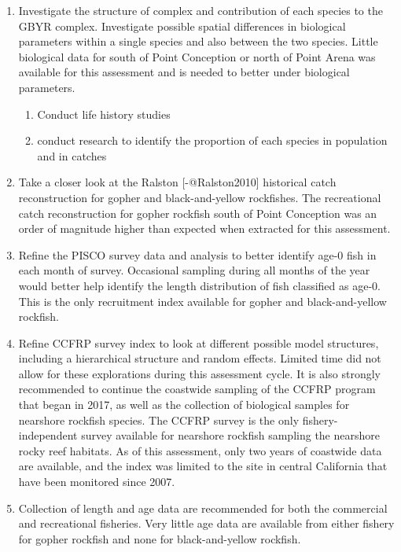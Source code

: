 \documentclass[12pt,]{article}
\begin{document}
\begin{enumerate}

\item Investigate the structure of complex and contribution of each species to the 
GBYR complex. Investigate possible spatial differences in biological parameters within 
a single species and also between the two species.  Little biological data for south of 
Point Conception or north of Point Arena was available for this assessment and is needed 
to better under biological parameters. 
    \begin{enumerate}
     \item Conduct life history studies
     \item conduct research to identify the proportion of each species in population and in catches
    \end{enumerate}

\item Take a closer look at the Ralston [-@Ralston2010] historical catch reconstruction 
for gopher and black-and-yellow rockfishes.  The recreational catch reconstruction for 
gopher rockfish south of Point Conception was an order of magnitude higher than expected 
when extracted for this assessment.  

\item Refine the PISCO survey data and analysis to better identify age-0 fish in each 
month of survey.  Occasional sampling during all months of the year would better help 
identify the length distribution of fish classified as age-0. This is the only recruitment 
index available for gopher and black-and-yellow rockfish.

\item Refine CCFRP survey index to look at different possible model structures, including 
a hierarchical structure and random effects.  Limited time did not allow for these 
explorations during this assessment cycle.  It is also strongly recommended to continue 
the coastwide sampling of the CCFRP program that began in 2017, as well as the collection 
of biological samples for nearshore rockfish species.  The CCFRP survey is the only 
fishery-independent survey available for nearshore rockfish sampling the nearshore rocky 
reef habitats. As of this assessment, only two years of coastwide data are available, 
and the index was limited to the site in central California that have been monitored 
since 2007.

\item Collection of length and age data are recommended for both the commercial and 
recreational fisheries.  Very little age data are available from either fishery for 
gopher rockfish and none for black-and-yellow rockfish.


\end{enumerate}
\end{document}
